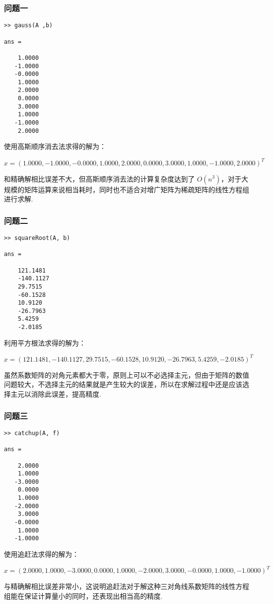 \subsubsection{问题一}

\begin{lstlisting}[frame=single]
>> gauss(A ,b)

ans =

    1.0000
   -1.0000
   -0.0000
    1.0000
    2.0000
    0.0000
    3.0000
    1.0000
   -1.0000
    2.0000

\end{lstlisting}

使用高斯顺序消去法求得的解为：

\[x = (1.0000, -1.0000, -0.0000, 1.0000, 2.0000, 0.0000, 3.0000, 1.0000, -1.0000, 2.0000)^T\]

和精确解相比误差不大，但高斯顺序消去法的计算复杂度达到了 $O(n^3)$，对于大规模的矩阵运算来说相当耗时，同时也不适合对增广矩阵为稀疏矩阵的线性方程组进行求解.

\subsubsection{问题二}

\begin{lstlisting}[frame=single]
>> squareRoot(A, b)

ans =

    121.1481
    -140.1127
    29.7515
    -60.1528
    10.9120
    -26.7963
    5.4259
    -2.0185

\end{lstlisting}

利用平方根法求得的解为：

\[x = (121.1481, -140.1127, 29.7515, -60.1528, 10.9120, -26.7963, 5.4259, -2.0185)^T\]

虽然系数矩阵的对角元素都大于零，原则上可以不必选择主元，但由于矩阵的数值问题较大，不选择主元的结果就是产生较大的误差，所以在求解过程中还是应该选择主元以消除此误差，提高精度.

\subsubsection{问题三}

\begin{lstlisting}[frame=single]
>> catchup(A, f)

ans =

    2.0000
    1.0000
   -3.0000
    0.0000
    1.0000
   -2.0000
    3.0000
   -0.0000
    1.0000
   -1.0000

\end{lstlisting}

使用追赶法求得的解为：

\[x= (2.0000,1.0000,-3.0000,0.0000,1.0000,-2.0000,3.0000,-0.0000,1.0000,-1.0000) ^ T\]

与精确解相比误差非常小，这说明追赶法对于解这种三对角线系数矩阵的线性方程组能在保证计算量小的同时，还表现出相当高的精度.